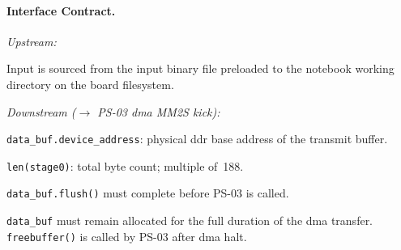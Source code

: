 
\FloatBarrier
\paragraph{Interface Contract.}

\textit{Upstream:}
\begin{tightemize}
  \item Input is sourced from the input binary file preloaded to
        the notebook working directory on the board filesystem.
\end{tightemize}

\textit{Downstream ($\rightarrow$ PS-03 \ac{dma} MM2S kick):}
\begin{tightemize}
  \item \texttt{data\_buf.device\_address}: physical \ac{ddr} base
        address of the transmit buffer.
  \item \texttt{len(stage0)}: total byte count; multiple of~188.
  \item \texttt{data\_buf.flush()} must complete before PS-03 is
        called.
  \item \texttt{data\_buf} must remain allocated for the full
        duration of the \ac{dma} transfer. \texttt{freebuffer()}
        is called by PS-03 after \ac{dma} halt.
\end{tightemize}


\FloatBarrier
